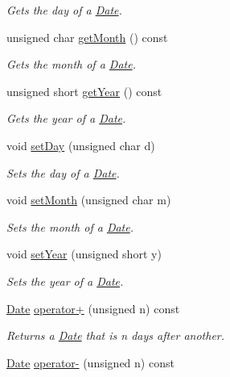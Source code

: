 \begin{DoxyCompactItemize}
\begin{DoxyCompactList}\small\item\em Gets the day of a \hyperlink{classDate}{Date}. \end{DoxyCompactList}\item 
unsigned char \hyperlink{classDate_a19533fb2b887fb8a22bf7a8b883cea12}{get\+Month} () const
\begin{DoxyCompactList}\small\item\em Gets the month of a \hyperlink{classDate}{Date}. \end{DoxyCompactList}\item 
unsigned short \hyperlink{classDate_a49eb7170cfb5b39f7d6dc4308fdc1f57}{get\+Year} () const
\begin{DoxyCompactList}\small\item\em Gets the year of a \hyperlink{classDate}{Date}. \end{DoxyCompactList}\item 
void \hyperlink{classDate_a41746b6e3a6f51b1c0f74426d72dcd2e}{set\+Day} (unsigned char d)
\begin{DoxyCompactList}\small\item\em Sets the day of a \hyperlink{classDate}{Date}. \end{DoxyCompactList}\item 
void \hyperlink{classDate_a722bc2dc26d3ab2b7e7184babaeb760d}{set\+Month} (unsigned char m)
\begin{DoxyCompactList}\small\item\em Sets the month of a \hyperlink{classDate}{Date}. \end{DoxyCompactList}\item 
void \hyperlink{classDate_a081df32ac89f7a92bffcd714f0570dba}{set\+Year} (unsigned short y)
\begin{DoxyCompactList}\small\item\em Sets the year of a \hyperlink{classDate}{Date}. \end{DoxyCompactList}\item 
\hyperlink{classDate}{Date} \hyperlink{classDate_a95ee06bbb5f83cc57bee03224296dcc8}{operator+} (unsigned n) const
\begin{DoxyCompactList}\small\item\em Returns a \hyperlink{classDate}{Date} that is n days after another. \end{DoxyCompactList}\item 
\hyperlink{classDate}{Date} \hyperlink{classDate_a66aee7889e49204ad68619efa5a3b2cc}{operator-\/} (unsigned n) const

\end{DoxyCompactItemize}
